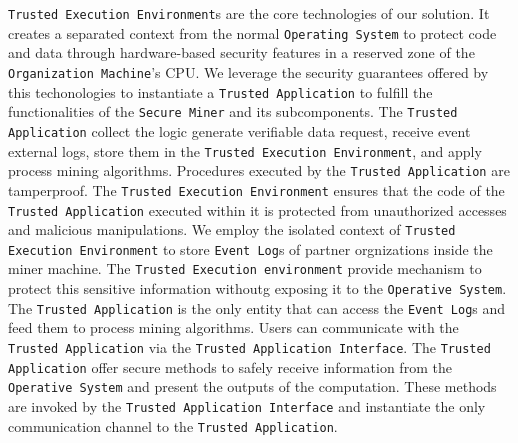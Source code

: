 \texttt{Trusted Execution Environment}s are the core technologies of our solution. It creates a separated context from the normal \texttt{Operating System} to protect code and data through hardware-based security features in a reserved zone of the \texttt{Organization Machine}'s CPU. We leverage the security guarantees offered by this techonologies to instantiate a \texttt{Trusted Application} to fulfill the functionalities of the \texttt{Secure Miner} and its subcomponents. The \texttt{Trusted Application} collect the logic generate verifiable data request, receive event external logs, store them in the \texttt{Trusted Execution Environment}, and apply process mining algorithms. Procedures executed by the \texttt{Trusted Application} are tamperproof. The \texttt{Trusted Execution Environment} ensures that the code of the \texttt{Trusted Application} executed within it is protected from unauthorized accesses and malicious manipulations. We employ the isolated context of \texttt{Trusted Execution Environment} to store \texttt{Event Log}s of partner orgnizations inside the miner machine. The \texttt{Trusted Execution environment} provide mechanism to protect this sensitive information withoutg exposing it to the \texttt{Operative System}. The \texttt{Trusted Application} is the only entity that can access the \texttt{Event Log}s and feed them to process mining algorithms. Users can communicate with the \texttt{Trusted Application} via the \texttt{Trusted Application Interface}. The \texttt{Trusted Application} offer secure methods to safely receive information from  the \texttt{Operative System} and present the outputs of the computation. These methods are invoked by the \texttt{Trusted Application Interface} and instantiate the only communication channel to the \texttt{Trusted Application}.
%


